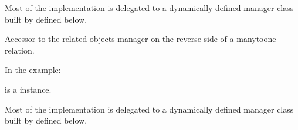 \documentclass[letterpaper,10pt,french]{sphinxmanual}
\begin{document}
\begin{fulllineitems}
\begin{fulllineitems}
\sphinxAtStartPar
Most of the implementation is delegated to a dynamically defined manager
class built by  defined below.

\end{fulllineitems}


\begin{fulllineitems}
\label{\detokenize{main/model:main.models.Semestre.evaluation_set}}
\pysigstartsignatures
{}
\pysigstopsignatures
\sphinxAtStartPar
Accessor to the related objects manager on the reverse side of a
many\sphinxhyphen{}to\sphinxhyphen{}one relation.

\sphinxAtStartPar
In the example:

\begin{sphinxVerbatim}[commandchars=\\\{\}]
 
       
\end{sphinxVerbatim}

\sphinxAtStartPar
{} is a  instance.

\sphinxAtStartPar
Most of the implementation is delegated to a dynamically defined manager
class built by  defined below.

\end{fulllineitems}


\begin{fulllineitems}
\label{\detokenize{main/model:main.models.Semestre.get_all_ues}}
\pysigstartsignatures
{}
\pysigstopsignatures
\end{fulllineitems}



\end{fulllineitems}
\end{document}
